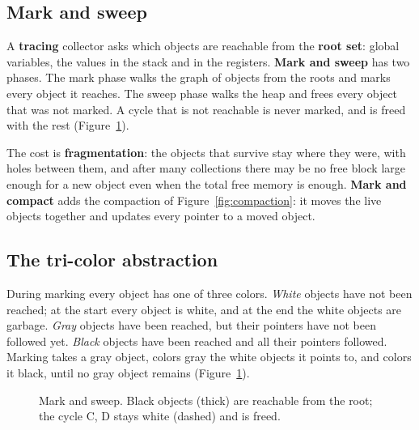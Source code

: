 \subsection{Mark and sweep}

A \textbf{tracing} collector asks which objects are reachable from the
\textbf{root set}: global variables, the values in the stack and in the
registers. \textbf{Mark and sweep} has two phases. The mark phase walks the
graph of objects from the roots and marks every object it reaches. The sweep
phase walks the heap and frees every object that was not marked. A cycle that
is not reachable is never marked, and is freed with the rest
(Figure~\ref{fig:mark-sweep}).

The cost is \textbf{fragmentation}: the objects that survive stay where they
were, with holes between them, and after many collections there may be no
free block large enough for a new object even when the total free memory is
enough. \textbf{Mark and compact} adds the compaction of
Figure~\ref{fig:compaction}: it moves the live objects together and updates
every pointer to a moved object.

\subsection{The tri-color abstraction}

During marking every object has one of three colors. \emph{White} objects
have not been reached; at the start every object is white, and at the end the
white objects are garbage. \emph{Gray} objects have been reached, but their
pointers have not been followed yet. \emph{Black} objects have been reached
and all their pointers followed. Marking takes a gray object, colors gray the
white objects it points to, and colors it black, until no gray object
remains (Figure~\ref{fig:mark-sweep}).

\begin{figure}[h]
\centering
{}
\caption{Mark and sweep. Black objects (thick) are reachable from the root; the cycle C, D stays white (dashed) and is freed.}
\label{fig:mark-sweep}
\end{figure}

